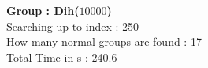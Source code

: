 \textbf{Group : Dih($10000$)}\\
Searching up to index : 250\\
How many normal groups are found : 17\\
Total Time in s : 240.6\\
